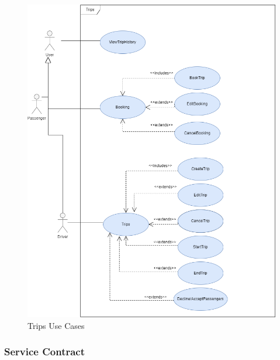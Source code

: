 \documentclass[hidelinks, 12pt, a4paper]{article}
\begin{document}
                    \begin{figure}[H]
                    
                        \centering
                        \includegraphics[width = 15cm]{images/Trips Usecase.drawio.png}
                        \caption{Trips Use Cases}
                        \label{fig:User UseCases}
                        
                    \end{figure}
         \newpage           
                \subsubsection{Service Contract}
            
\end{document}
